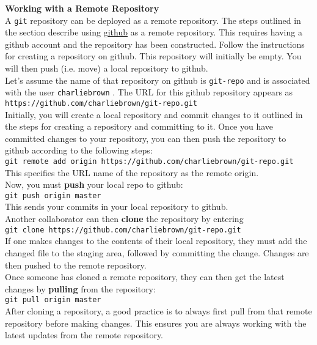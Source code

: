 \documentclass[11pt]{article}
\begin{document}
\noindent
{\bf Working with a Remote Repository} \\

\noindent
A {\tt git} repository can be deployed as a remote repository. The steps outlined in the section describe using \href{http://github.com}{github} as a remote repository. This requires  having a github account and the repository has been constructed. Follow the instructions for creating a repository on github. This repository will initially be empty. You will then push (i.e. move) a local repository to github.\\

\noindent
Let's assume the name of that repository on github is {\tt git-repo} and is associated with the user {\tt charliebrown} . The {\small URL} for this github repository appears as \\

{\tt https://github.com/charliebrown/git-repo.git} \\

\noindent
Initially, you will create a local repository and commit changes to it outlined in the steps for creating a repository and committing to it. Once you have committed changes to your repository, you can then push the repository to github according to the following steps: \\

{\tt git remote add origin https://github.com/charliebrown/git-repo.git} \\

\noindent
This specifies the {\small URL} name of the repository as the remote origin. \\

\noindent
Now, you must {\bf push} your local repo to github: \\

{\tt git push origin master} \\

\noindent
This sends your commits in your local repository to github. \\

\noindent
Another collaborator can then {\bf clone} the repository by entering \\

{\tt git clone https://github.com/charliebrown/git-repo.git} \\

\noindent
If one makes changes to the contents of their local repository, they must add the changed file to the staging area, followed by committing the change. Changes are then pushed to the remote repository. \\

\noindent
Once someone has cloned a remote repository, they can then get the latest changes by {\bf pulling} from the repository: \\

{\tt git pull origin master} \\

\noindent
After cloning a repository, a good practice is to always first pull from that remote repository before making changes. This ensures you are always working with the latest updates from the remote repository. \\
\end{document}
